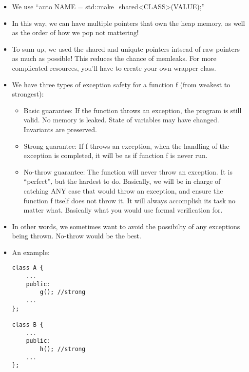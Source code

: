 \documentclass{article}
\begin{document}
\begin{itemize}
\item We use ``auto NAME = std::make_shared<CLASS>(VALUE);''
\item In this way, we can have multiple pointers that own the heap memory, as well as the order of how we pop not mattering!
\item To sum up, we used the shared and uniqute pointers intsead of raw pointers as much as possible!  This reduces the chance of memleaks.  For more complicated resources, you'll have to create your own wrapper class.
\item We have three types of exception safety for a function f (from weakest to strongest):
\begin{itemize}
\item Basic guarantee: If the function throws an exception, the program is still valid.  No memory is leaked.  State of variables may have changed.  Invariants are preserved.
\item Strong guarantee:  If f throws an exception, when the handling of the exception is completed, it will be as if function f is never run.
\item No-throw guarantee:  The function will never throw an exception.  It is ``perfect'', but the hardest to do.  Basically, we will be in charge of catching ANY case that would throw an exception, and ensure the function f itself does not throw it.  It will always accomplish its task no matter what.  Basically what you would use formal verification for.
\end{itemize}
\item In other words, we sometimes want to avoid the possibilty of any exceptions being thrown.  No-throw would be the best.
\item An example:
\begin{lstlisting}
class A {
    ...
    public:
        g(); //strong
    ...
};

class B {
    ...
    public:
        h(); //strong
    ...
};


\end{lstlisting}
\end{itemize}
\end{document}
